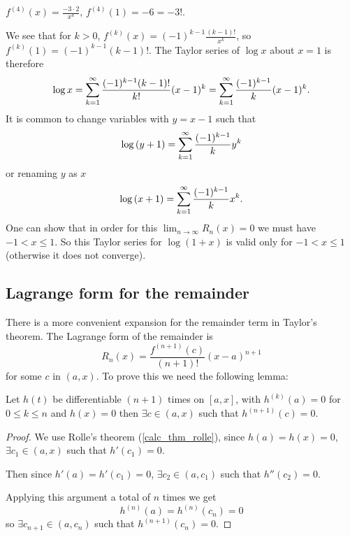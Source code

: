 \documentclass[10pt, a4paper]{article}
\begin{document}
$f ^ {(4)}(x) = \frac{-3 \cdot 2}{x ^ 4}$,
$f ^ {(4)}(1) = -6 = -3!$.

We see that for $k > 0$,
$f ^ {(k)}(x) = (-1) ^ {k - 1}\frac{(k - 1)!}{x ^ k}$,
so $f ^ {(k)}(1) = (-1) ^ {k - 1}(k - 1)!$.
The Taylor series of $\log{x}$ about $x = 1$ is therefore
\[
\log{x} = \infsum[k = 1]\frac{(-1) ^ {k - 1}(k - 1)!}{k!}(x - 1) ^ k = \infsum[k = 1]\frac{(-1) ^ {k - 1}}{k}(x - 1) ^ k.
\]
It is common to change variables with $y = x - 1$ such that
\[
\log{(y + 1)} = \infsum[k = 1]\frac{(-1) ^ {k - 1}}{k}y ^ k
\]
or renaming $y$ as $x$
\[
\log{(x + 1)} = \infsum[k = 1]\frac{(-1) ^ {k - 1}}{k}x ^ k.
\]
One can show that in order for this $\lim_{n \rightarrow \infty}R_n(x) = 0$ we must have $-1 < x \leq 1$.
So this Taylor series for $\log(1 + x)$ is valid only for $-1 < x \leq 1$
(otherwise it does not converge).

\subsection{Lagrange form for the remainder}
There is a more convenient expansion for the remainder term in Taylor's theorem.
The Lagrange form of the remainder is
\[
R_n(x) = \frac{f ^ {(n + 1)}(c)}{(n + 1)!}(x - a) ^ {n + 1}
\]
for some $c$ in $(a, x)$.
To prove this we need the following lemma:
\begin{lemma}
    Let $h(t)$ be differentiable $(n + 1)$ times on $[a, x]$,
    with $h ^ {(k)}(a) = 0$ for $0 \leq k \leq n$ and $h(x) = 0$ then $\exists c \in (a, x)$ such that $h ^ {(n + 1)}(c) = 0$.
    \begin{proof}
        We use Rolle's theorem
        (\autoref{calc_thm_rolle}),
        since $h(a) = h(x) = 0$,
        $\exists c_1 \in (a, x)$ such that $h'(c_1) = 0$.

        Then since $h'(a) = h'(c_1) = 0$,
        $\exists c_2 \in (a, c_1)$ such that $h''(c_2) = 0$.

        Applying this argument a total of $n$ times we get
        \[
        h ^ {(n)}(a) = h ^ {(n)}(c_n) = 0
        \]
        so $\exists c_{n + 1} \in (a, c_n)$ such that $h ^ {(n + 1)}(c_n) = 0$.
    \end{proof}
\end{lemma}
\end{document}

